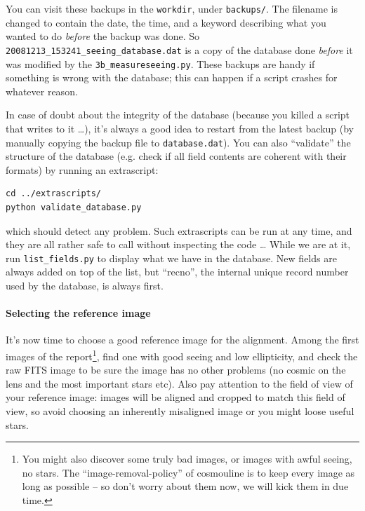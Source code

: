 You can visit these backups in the \verb+workdir+, under \verb+backups/+. The filename is changed to contain the date, the time, and a keyword describing what you wanted to do \emph{before} the backup was done. So \verb+20081213_153241_seeing_database.dat+ is a copy of the database done \emph{before} it was modified by the \verb+3b_measureseeing.py+.
These backups are handy if something is wrong with the database; this can happen if a script crashes for whatever reason.

In case of doubt about the integrity of the database (because you killed a script that writes to it \ldots), it's always a good idea to restart from the latest backup (by manually copying the backup file to \verb+database.dat+). You can also ``validate'' the structure of the database (e.g. check if all field contents are coherent with their formats) by running an extrascript:

\begin{Verbatim}
cd ../extrascripts/
python validate_database.py
\end{Verbatim}
which should detect any problem. Such extrascripts can be run at any time, and they are all rather safe to call without inspecting the code \ldots
While we are at it, run \verb+list_fields.py+ to display what we have in the database. New fields are always added on top of the list, but ``recno'', the internal unique record number used by the database, is always first.


\paragraph{Selecting the reference image}

It's now time to choose a good reference image for the alignment. Among the first images of the report\footnote{You might also discover some truly bad images, or images with awful seeing, no stars. The ``image-removal-policy'' of cosmouline is to keep every image as long as possible -- so don't worry about them now, we will kick them in due time.}, find one with good seeing and low ellipticity, and check the raw FITS image to be sure the image has no other problems (no cosmic on the lens and the most important stars etc). Also pay attention to the field of view of your reference image: images will be aligned and cropped to match this field of view, so avoid choosing an inherently misaligned image or you might loose useful stars.


